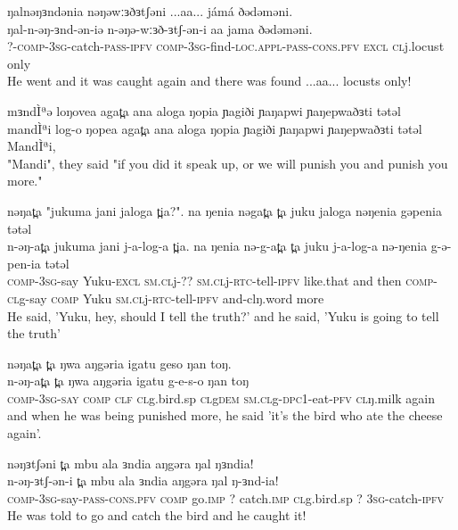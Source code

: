 \ex  ŋalnəŋɜndənia nəŋəwːɜðɜtʃəni ...aa... jámá ðədəməni. 	  \\ 
	\gll  ŋal-n-əŋ-ɜnd-ən-iə n-əŋə-wːɜð-ɜtʃ-ən-i  aa jama ðədəməni.\\	
		  ?-\textsc{comp-3sg}-catch-\textsc{pass-ipfv} \textsc{comp-3sg}-find-\textsc{loc.appl-pass-cons.pfv} \textsc{excl} \textsc{cl}j.locust only  \\
		 \glt He went and it was caught again and there was found ...aa... locusts only! 
		  	  
\ex  mɜndÌªə loŋovea agat̪a ana aloga ŋopia ɲagiði ɲaŋapwi ɲaŋepwaðɜti tətəl 	  \\ 
	\gll  mandÌªi log-o ŋopea agat̪a ana aloga ŋopia ɲagiði ɲaŋapwi ɲaŋepwaðɜti tətəl\\	
		  MandÌªi,   \\
		 \glt "Mandi", they said "if you did it speak up, or we will punish you and punish you more."  
		  	  
\ex  nəŋat̪a "jukuma jani jaloga t̪ia?". na ŋenia nəgat̪a t̪a juku jaloga nəŋenia gəpenia tətəl 	  \\ 
	\gll  n-əŋ-at̪a jukuma jani j-a-log-a t̪ia. na ŋenia nə-g-at̪a t̪a juku j-a-log-a nə-ŋenia g-ə-pen-ia tətəl\\	
		  \textsc{comp-3sg}-say Yuku-\textsc{excl} \textsc{sm.cl}j-?? \textsc{sm.cl}j-\textsc{rtc}-tell-\textsc{ipfv} like.that and then \textsc{comp-cl}g-say \textsc{comp} Yuku \textsc{sm.cl}j-\textsc{rtc}-tell-\textsc{ipfv} and-{cl}ŋ.word more   \\
		 \glt He said, 'Yuku, hey, should I tell the truth?' and he said, 'Yuku is going to tell the truth' 
		 
\ex		 nəŋat̪a t̪a ŋwa aŋgəria igatu geso ŋan toŋ.\\
	\gll n-əŋ-at̪a t̪a ŋwa aŋgəria igatu g-e-s-o ŋan toŋ\\
	\textsc{comp-3sg-say} \textsc{comp} \textsc{clf} \textsc{cl}g.bird.sp \textsc{cl}g\textsc{dem} \textsc{sm.cl}g-\textsc{dpc1}-eat-\textsc{pfv} \textsc{cl}ŋ.milk again  \\
		\glt and when he was being punished more, he said 'it's the bird who ate the cheese again'.  
		  	  
\ex  nəŋɜtʃəni t̪a mbu ala ɜndia aŋgəra ŋal ŋɜndia!	  \\ 
	\gll  n-əŋ-ɜtʃ-ən-i t̪a mbu ala ɜndia aŋgəra ŋal ŋ-ɜnd-ia!\\	
		  \textsc{comp-3sg}-say-\textsc{pass-cons.pfv} \textsc{comp} go.\textsc{imp} ? catch.\textsc{imp} \textsc{cl}g.bird.sp ? \textsc{3sg}-catch-\textsc{ipfv}  \\
		 \glt He was told to go and catch the bird and he caught it!  
		 	  	  
